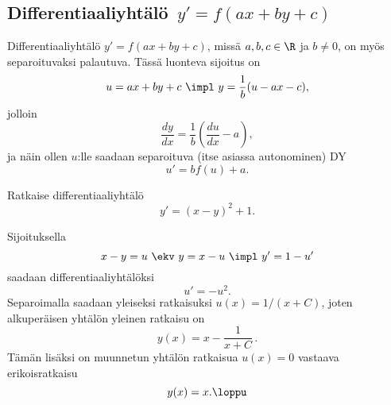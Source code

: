 \subsection*{Differentiaaliyhtälö $\,y'=f(ax+by+c)$}

Differentiaaliyhtälö $y'=f(ax+by+c)$, missä $a,b,c\in\R$ ja $b \neq 0$, on myös separoituvaksi
palautuva. Tässä luonteva sijoitus on
\[
u=ax+by+c \ \impl \ y=\frac{1}{b}(u-ax-c),
\]
jolloin
\[
\frac{dy}{dx}=\frac{1}{b}\left(\frac{du}{dx}-a\right),
\]
ja näin ollen $u$:lle saadaan separoituva (itse asiassa autonominen) DY
\[
u'=bf(u)+a.
\]
\begin{Exa}
Ratkaise differentiaaliyhtälö
\[
y'=(x-y)^2+1.
\]
\end{Exa}
\ratk Sijoituksella
\[
x-y=u \ \ekv \ y=x-u \ \impl \ y'=1-u'
\]
saadaan differentiaaliyhtälöksi
\[
u'=-u^2.
\]
Separoimalla saadaan yleiseksi ratkaisuksi $u(x)=1/(x+C)$, joten alkuperäisen yhtälön yleinen
ratkaisu on
\[
y(x)=x-\frac{1}{x+C}\,.
\]
Tämän lisäksi on muunnetun yhtälön ratkaisua $u(x)=0$ vastaava erikoisratkaisu
\[
y(x)=x. \loppu
\]

